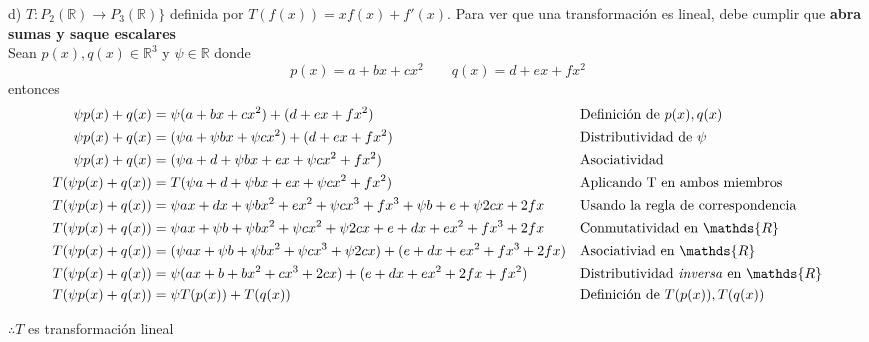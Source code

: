 \documentclass[letterpaper]{article}
\newcommand{\R}{\mathds{R}}
\renewcommand{\*}{\cdot}
\theoremstyle{definition}
\begin{document}
	
	d) $T: P_{2}(\mathbb{R}) \longrightarrow P_{3}(\mathbb{R}) \rbrace$ definida por $T(f(x)) = xf(x) + f'(x)$.
	Para ver que una transformación es lineal, debe cumplir que \textbf{abra sumas y saque escalares}\\
	Sean $ p(x), q(x) \in \R^3 $ y $ \psi \in \R $ donde
	\[ p(x) = a + bx + cx^2 \qquad q(x) = d + ex + fx^2 \]
	entonces 
	\begin{align*}
		\psi p(x) + q(x) &= \psi (a + bx + cx^2) + (d + ex + fx^2) && \text{Definición de $ p(x), q(x) $}\\
		\psi p(x) + q(x) &= (\psi a + \psi bx + \psi cx^2) + (d + ex + fx^2) && \text{Distributividad de $\psi$}\\
		\psi p(x) + q(x) &= (\psi a+d + \psi bx + ex + \psi cx^2 + fx^2)&& \text{Asociatividad}\\
		T(\psi p(x) + q(x)) &= T(\psi a +d + \psi bx + ex + \psi cx^2 + fx^2)&& \text{Aplicando T en ambos miembros}\\
		T(\psi p(x) + q(x)) &= \psi ax + dx + \psi bx^2 + ex^2 + \psi cx^3 + fx^3 + \psi b + e + \psi 2cx + 2fx&& \text{Usando la regla de correspondencia}\\
		T(\psi p(x) + q(x)) &= \psi ax + \psi b + \psi b x^2+ \psi cx^2 + \psi 2cx + e +dx + ex^2  + fx^3 + 2fx&& \text{Conmutatividad en $ \R $}\\
		T(\psi p(x) + q(x)) &= (\psi ax + \psi b + \psi b x^2+ \psi cx^3 + \psi 2cx) + (e +dx + ex^2  + fx^3 + 2fx)&& \text{Asociativiad en $ \R $}\\
		T(\psi p(x) + q(x)) &= \psi(ax + b + bx^2+ cx^3 + 2cx) + (e + dx + ex^2 + 2fx + fx^2 )&& \text{Distributividad \textit{inversa} en $ \R $}\\
		T(\psi p(x) + q(x)) &= \psi T(p(x)) + T(q(x))&& \text{Definición de $ T(p(x)), T(q(x)) $}\\
	\end{align*}
	\begin{center}
		$ \therefore T $ es transformación lineal
	\end{center}
\end{document}
